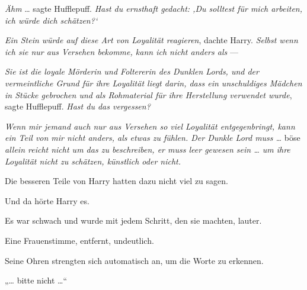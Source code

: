 \emph{Ähm} … sagte Hufflepuff. \emph{Hast du ernsthaft gedacht: ‚Du solltest für mich arbeiten, ich würde dich schätzen?‘}

\emph{Ein Stein würde auf diese Art von Loyalität reagieren}, dachte Harry. \emph{Selbst wenn ich sie nur aus Versehen bekomme, kann ich nicht anders als} —

\emph{Sie ist die loyale Mörderin und Foltererin des Dunklen Lords, und der vermeintliche Grund für ihre Loyalität liegt darin, dass ein unschuldiges Mädchen in Stücke gebrochen und als Rohmaterial für ihre Herstellung verwendet wurde}, sagte Hufflepuff. \emph{Hast du das vergessen?}

\emph{Wenn mir jemand auch nur aus Versehen so viel Loyalität entgegenbringt, kann ein Teil von mir nicht anders, als etwas zu fühlen. Der Dunkle Lord muss …} böse \emph{allein reicht nicht um das zu beschreiben, er muss leer gewesen sein … um ihre Loyalität nicht zu schätzen, künstlich oder nicht.}

Die besseren Teile von Harry hatten dazu nicht viel zu sagen.

Und da hörte Harry es.

Es war schwach und wurde mit jedem Schritt, den sie machten, lauter.

Eine Frauenstimme, entfernt, undeutlich.

Seine Ohren strengten sich automatisch an, um die Worte zu erkennen.

„… bitte nicht …“

